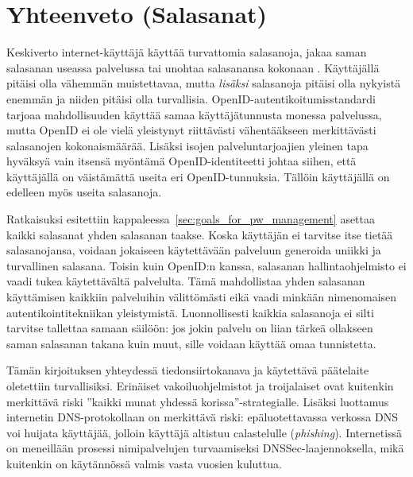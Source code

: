 \documentclass[english,gradu]{tktltiki}
\begin{document}
\section{Yhteenveto (Salasanat)}

Keskiverto internet-käyttäjä käyttää turvattomia salasanoja, jakaa saman salasanan useassa palvelussa tai unohtaa salasanansa kokonaan \cite{study_of_passwords_07, password_management_strategies_06, generating_and_remembering_pws_04, users_are_not_the_enemy_99}. Käyttäjällä pitäisi olla vähemmän muistettavaa, mutta \emph{lisäksi} salasanoja pitäisi olla nykyistä enemmän ja niiden pitäisi olla turvallisia.
OpenID-autentikoitumisstandardi tarjoaa mahdollisuuden käyttää samaa käyttäjätunnusta monessa palvelussa, mutta OpenID ei ole vielä yleistynyt riittävästi vähentääkseen merkittävästi salasanojen kokonaismäärää. Lisäksi isojen palveluntarjoajien yleinen tapa hyväksyä vain itsensä myöntämä OpenID-identiteetti johtaa siihen, että käyttäjällä on väistämättä useita eri OpenID-tunnuksia. Tällöin käyttäjällä on edelleen myös useita salasanoja.

Ratkaisuksi esitettiin kappaleessa~\ref{sec:goals_for_pw_management} asettaa kaikki salasanat yhden salasanan taakse. Koska käyttäjän ei tarvitse itse tietää salasanojansa, voidaan jokaiseen käytettävään palveluun generoida uniikki ja turvallinen salasana. Toisin kuin OpenID:n kanssa, salasanan hallintaohjelmisto ei vaadi tukea käytettävältä palvelulta. Tämä mahdollistaa yhden salasanan käyttämisen kaikkiin palveluihin välittömästi eikä vaadi minkään nimenomaisen autentikointitekniikan yleistymistä. Luonnollisesti kaikkia salasanoja ei silti tarvitse tallettaa samaan säilöön: jos jokin palvelu on liian tärkeä ollakseen saman salasanan takana kuin muut, sille voidaan käyttää omaa tunnistetta.

Tämän kirjoituksen yhteydessä tiedonsiirtokanava ja käytettävä päätelaite oletettiin turvallisiksi. Erinäiset vakoiluohjelmistot ja troijalaiset ovat kuitenkin merkittävä riski ''kaikki munat yhdessä korissa''-strategialle. Lisäksi luottamus internetin DNS-protokollaan on merkittävä riski: epäluotettavassa verkossa DNS voi huijata käyttäjää, jolloin käyttäjä altistuu calastelulle (\emph{phishing}).
Internetissä on meneillään prosessi nimipalvelujen turvaamiseksi DNSSec-laajennoksella, mikä kuitenkin on käytännössä valmis vasta vuosien kuluttua.
\end{document}
